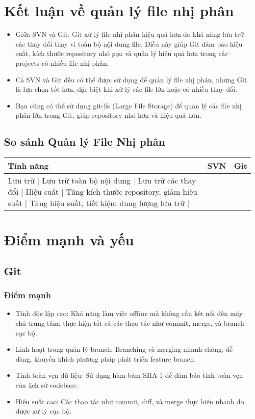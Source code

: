 \section{Kết luận về quản lý file nhị phân}
\begin{itemize}
    \item Giữa SVN và Git, Git xử lý file nhị phân hiệu quả hơn do khả năng lưu trữ các thay đổi thay vì toàn bộ nội dung file. Điều này giúp Git đảm bảo hiệu suất, kích thước repository nhỏ gọn và quản lý hiệu quả hơn trong các projects có nhiều file nhị phân.
    \item Cả SVN và Git đều có thể được sử dụng để quản lý file nhị phân, nhưng Git là lựa chọn tốt hơn, đặc biệt khi xử lý các file lớn hoặc có nhiều thay đổi.
    \item Bạn cũng có thể sử dụng git-lfs (Large File Storage) để quản lý các file nhị phân lớn trong Git, giúp repository nhỏ hơn và hiệu quả hơn.
\end{itemize}
\subsection{So sánh Quản lý File Nhị phân}

\begin{tabular}{|l|l|l|}
\hline
Tính năng & SVN & Git \\ \hline
Lưu trữ | Lưu trữ toàn bộ nội dung | Lưu trữ các thay đổi |
\hline
Hiệu suất |  Tăng kích thước repository, giảm hiệu suất |  Tăng hiệu suất, tiết kiệm dung lượng lưu trữ |
\hline
\end{tabular}

\section{Điểm mạnh và yếu}
\subsection{Git}
\subsubsection{Điểm mạnh}
\begin{itemize}
    \item Tính độc lập cao: Khả năng làm việc offline mà không cần kết nối đến máy chủ trung tâm; thực hiện tất cả các thao tác như commit, merge, và branch cục bộ.
    \item Linh hoạt trong quản lý branch: Branching và merging nhanh chóng, dễ dàng, khuyến khích phương pháp phát triển feature branch.
    \item Tính toàn vẹn dữ liệu: Sử dụng hàm băm SHA-1 để đảm bảo tính toàn vẹn của lịch sử codebase.
    \item Hiệu suất cao: Các thao tác như commit, diff, và merge thực hiện nhanh do được xử lý cục bộ.
\end{itemize}

